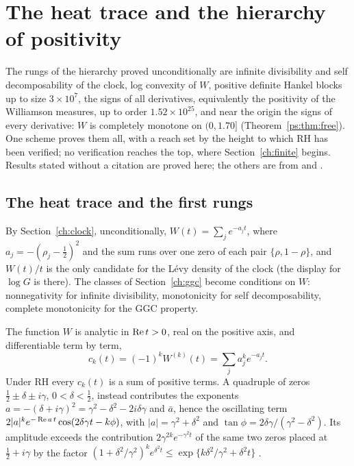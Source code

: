 \section{The heat trace and the hierarchy of positivity}\label{ch:heat}

The rungs of the hierarchy proved unconditionally are infinite divisibility and self decomposability of the clock, log convexity of $W$, positive definite Hankel blocks up to size $3\times10^7$, the signs of all derivatives, equivalently the positivity of the Williamson measures, up to order $1.52\times10^{25}$, and near the origin the signs of every derivative: $W$ is completely monotone on $(0,1.70]$ (Theorem~\ref{ps:thm:free}). One scheme proves them all, with a reach set by the height to which RH has been verified; no verification reaches the top, where Section~\ref{ch:finite} begins. Results stated without a citation are proved here; the others are from \cite[Chapters 4 and 5]{P26} and \cite{P17}.

\subsection{The heat trace and the first rungs}

By Section~\ref{ch:clock}, unconditionally, $W(t)=\sum_je^{-a_jt}$, where $a_j=-(\rho_j-\frac12)^2$ and the sum runs over one zero of each pair $\{\rho,1-\rho\}$, and $W(t)/t$ is the only candidate for the L\'evy density of the clock (the display for $\log G$ is there). The classes of Section~\ref{ch:ggc} become conditions on $W$: nonnegativity for infinite divisibility, monotonicity for self decomposability, complete monotonicity for the GGC property.

The function $W$ is analytic in $\operatorname{Re} t>0$, real on the positive axis, and differentiable term by term,
\[
c_k(t)=(-1)^kW^{(k)}(t)=\sum_ja_j^ke^{-a_jt}.
\]
Under RH every $c_k(t)$ is a sum of positive terms. A quadruple of zeros $\frac12\pm\delta\pm i\gamma$, $0<\delta<\frac12$, instead contributes the exponents $a=-(\delta+i\gamma)^2=\gamma^2-\delta^2-2i\delta\gamma$ and $\bar a$, hence the oscillating term $2|a|^ke^{-\operatorname{Re} a\,t}\cos(2\delta\gamma t-k\phi)$, with $|a|=\gamma^2+\delta^2$ and $\tan\phi=2\delta\gamma/(\gamma^2-\delta^2)$. Its amplitude exceeds the contribution $2\gamma^{2k}e^{-\gamma^2t}$ of the same two zeros placed at $\frac12+i\gamma$ by the factor $(1+\delta^2/\gamma^2)^ke^{\delta^2t}\le\exp\{k\delta^2/\gamma^2+\delta^2t\}$ \cite[Proposition 11.1]{P17}.


